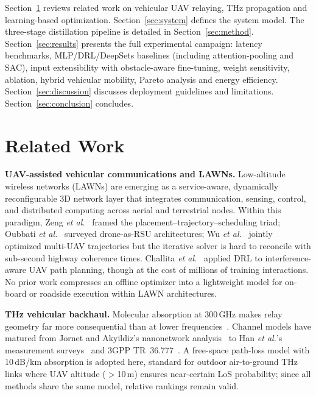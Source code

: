 \documentclass[journal]{IEEEtran}
\begin{document}
Section~\ref{sec:related} reviews related work on vehicular UAV relaying, THz propagation and learning-based optimization. Section~\ref{sec:system} defines the system model. The three-stage distillation pipeline is detailed in Section~\ref{sec:method}. Section~\ref{sec:results} presents the full experimental campaign: latency benchmarks, MLP/DRL/DeepSets baselines (including attention-pooling and SAC), input extensibility with obstacle-aware fine-tuning, weight sensitivity, ablation, hybrid vehicular mobility, Pareto analysis and energy efficiency. Section~\ref{sec:discussion} discusses deployment guidelines and limitations. Section~\ref{sec:conclusion} concludes.


\section{Related Work}
\label{sec:related}

\textbf{UAV-assisted vehicular communications and LAWNs.}
Low-altitude wireless networks (LAWNs) are emerging as a service-aware, dynamically reconfigurable 3D network layer that integrates communication, sensing, control, and distributed computing across aerial and terrestrial nodes. Within this paradigm, Zeng \textit{et al.}~\cite{zeng2016wireless} framed the placement--trajectory--scheduling triad; Oubbati \textit{et al.}~\cite{oubbati2020} surveyed drone-as-RSU architectures; Wu \textit{et al.}~\cite{wu2018multi} jointly optimized multi-UAV trajectories but the iterative solver is hard to reconcile with sub-second highway coherence times. Challita \textit{et al.}~\cite{challita2019} applied DRL to interference-aware UAV path planning, though at the cost of millions of training interactions. No prior work compresses an offline optimizer into a lightweight model for on-board or roadside execution within LAWN architectures.

\textbf{THz vehicular backhaul.}
Molecular absorption at 300\,GHz makes relay geometry far more consequential than at lower frequencies~\cite{akyildiz2022, sarieddeen2021}. Channel models have matured from Jornet and Akyildiz's nanonetwork analysis~\cite{jornet2011} to Han \textit{et al.}'s measurement surveys~\cite{han2022} and 3GPP TR~36.777~\cite{3gpp36777}. A free-space path-loss model with 10\,dB/km absorption is adopted here, standard for outdoor air-to-ground THz links where UAV altitude ($>$10\,m) ensures near-certain LoS probability; since all methods share the same model, relative rankings remain valid.
\end{document}
